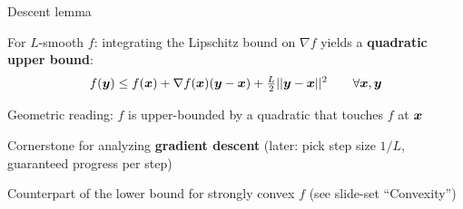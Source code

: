\documentclass[11pt,compress,t,notes=noshow, xcolor=table]{beamer}
\begin{document}
\begin{framei}{Descent lemma}
\item For $L$-smooth $f$: integrating the Lipschitz bound on $\nabla f$ yields a \textbf{quadratic upper bound}:
$$
f(\bm{y}) \leq f(\bm{x}) + \nabla f(\bm{x})(\bm{y} - \bm{x}) + \tfrac{L}{2}||\bm{y} - \bm{x}||^2 \qquad \forall \bm{x}, \bm{y}
$$
\item Geometric reading: $f$ is upper-bounded by a quadratic that touches $f$ at $\bm{x}$
\item Cornerstone for analyzing \textbf{gradient descent} (later: pick step size $1/L$, guaranteed progress per step)
\item Counterpart of the lower bound for strongly convex $f$ (see slide-set ``Convexity'')
\end{framei}


\endlecture
\end{document}
